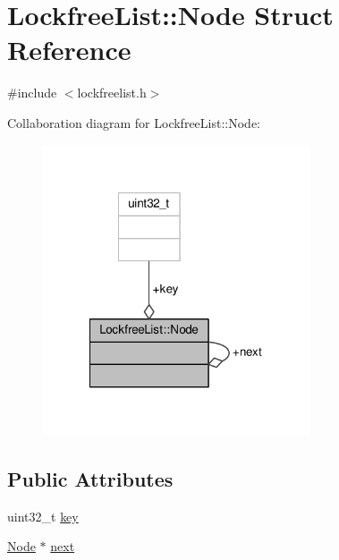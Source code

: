 \hypertarget{structLockfreeList_1_1Node}{\section{Lockfree\-List\-:\-:Node Struct Reference}
\label{structLockfreeList_1_1Node}
}


{\ttfamily \#include $<$lockfreelist.\-h$>$}



Collaboration diagram for Lockfree\-List\-:\-:Node\-:
\nopagebreak
\begin{figure}[H]
\begin{center}
\leavevmode
\includegraphics[width=224pt]{structLockfreeList_1_1Node__coll__graph}
\end{center}
\end{figure}
\subsection*{Public Attributes}
\begin{DoxyCompactItemize}
\item 
uint32\-\_\-t \hyperlink{structLockfreeList_1_1Node_a6830d823a3fad2bf88fe1b1b7e25786c}{key}
\item 
\hyperlink{structLockfreeList_1_1Node}{Node} $\ast$ \hyperlink{structLockfreeList_1_1Node_a89b9c0742a414a580760301965734d0f}{next}
\end{DoxyCompactItemize}


